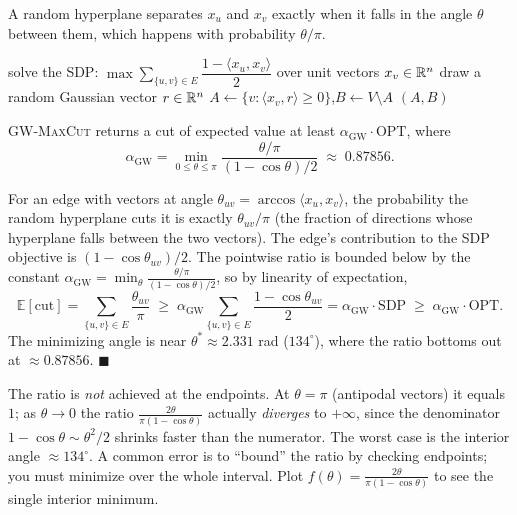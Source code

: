 A random hyperplane separates $x_u$ and $x_v$ exactly when it falls in the angle $\theta$ between
them, which happens with probability $\theta/\pi$.

\begin{algorithm}[H]
\caption{\textsc{GW-MaxCut}$(\Gph)$}\label{ch38:alg-gw}
\DontPrintSemicolon
solve the SDP: $\max \sum_{\{u,v\}\in E}\dfrac{1-\langle x_u,x_v\rangle}{2}$ over unit vectors $x_v\in\mathbb{R}^n$\;
draw a random Gaussian vector $r\in\mathbb{R}^n$\;
$A \gets \{v: \langle x_v, r\rangle \ge 0\}$,\quad $B \gets V\setminus A$\;
\Return $(A,B)$\;
\end{algorithm}

\begin{theorem}\label{ch38:thm-gw}
\textsc{GW-MaxCut} returns a cut of expected value at least $\alpha_{\mathrm{GW}}\cdot\mathrm{OPT}$,
where
\[
  \alpha_{\mathrm{GW}} = \min_{0\le\theta\le\pi}\frac{\theta/\pi}{(1-\cos\theta)/2}
  \;\approx\; 0.87856.
\]
\end{theorem}

\begin{whybox}
For an edge with vectors at angle $\theta_{uv}=\arccos\langle x_u,x_v\rangle$, the probability the
random hyperplane cuts it is exactly $\theta_{uv}/\pi$ (the fraction of directions whose hyperplane
falls between the two vectors). The edge's contribution to the SDP objective is
$(1-\cos\theta_{uv})/2$. The pointwise ratio is bounded below by the constant
$\alpha_{\mathrm{GW}}=\min_\theta \frac{\theta/\pi}{(1-\cos\theta)/2}$, so by linearity of
expectation,
\[
  \mathbb{E}[\text{cut}] = \sum_{\{u,v\}\in E}\frac{\theta_{uv}}{\pi}
  \;\ge\; \alpha_{\mathrm{GW}}\sum_{\{u,v\}\in E}\frac{1-\cos\theta_{uv}}{2}
  = \alpha_{\mathrm{GW}}\cdot\mathrm{SDP}
  \;\ge\; \alpha_{\mathrm{GW}}\cdot\mathrm{OPT}.
\]
The minimizing angle is near $\theta^\ast\approx 2.331$ rad ($134^\circ$), where the ratio bottoms out
at $\approx 0.87856$. $\blacksquare$
\end{whybox}

\begin{trapbox}
The ratio is \emph{not} achieved at the endpoints. At $\theta=\pi$ (antipodal vectors) it equals $1$;
as $\theta\to 0$ the ratio $\frac{2\theta}{\pi(1-\cos\theta)}$ actually \emph{diverges} to $+\infty$,
since the denominator $1-\cos\theta\sim\theta^2/2$ shrinks faster than the numerator. The worst case
is the interior angle $\approx 134^\circ$. A common error is to ``bound'' the ratio by checking
endpoints; you must minimize over the whole interval. Plot $f(\theta)=\frac{2\theta}{\pi(1-\cos\theta)}$
to see the single interior minimum.
\end{trapbox}

